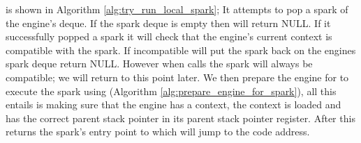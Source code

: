 \tryrunlocalspark is shown in Algorithm \ref{alg:try_run_local_spark};
It attempts to pop a spark of the engine's deque.
If the spark deque is empty then \tryrunlocalspark
will return NULL.
If it successfully popped a spark it will
check that the engine's current context is compatible with the spark.
If incompatible \tryrunlocalspark will put the spark back on the engines
spark deque return NULL.
However when \idle calls \tryrunlocalspark the spark will always be
compatible;
we will return to this point later.
We then prepare the engine for to execute the spark using
\prepareengineforspark
(Algorithm \ref{alg:prepare_engine_for_spark}),
all this entails is making sure that the engine has a context, the context
is loaded and has the correct parent stack pointer in its parent stack
pointer register.
After this \tryrunlocalspark returns the spark's entry point to \idle which
will jump to the code address.

